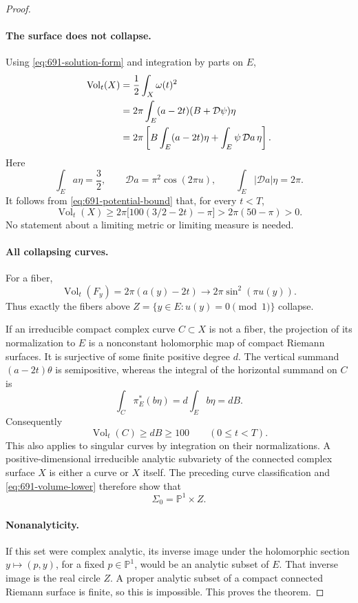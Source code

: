 \documentclass[11pt,a4paper]{article}
\theoremstyle{remark}
\begin{document}
\begin{proof}
\paragraph{The surface does not collapse.}
Using \eqref{eq:691-solution-form} and integration by parts on $E$,
\begin{align}
 \operatorname{Vol}_t(X)
 &=\frac12\int_X\omega(t)^2\notag\\
 &=2\pi\int_E(a-2t)(B+\mathcal D\psi)\eta\notag\\
 &=2\pi\left[B\int_E(a-2t)\eta
                 +\int_E\psi\,\mathcal D a\,\eta\right].
 \label{eq:691-volume}
\end{align}
Here
\[
 \int_E a\eta=\frac32,\qquad
 \mathcal D a=\pi^2\cos(2\pi u),\qquad
 \int_E|\mathcal D a|\eta=2\pi.
\]
It follows from \eqref{eq:691-potential-bound} that, for every $t<T$,
\begin{equation}
 \operatorname{Vol}_t(X)
 \ge2\pi\bigl[100(3/2-2t)-\pi\bigr]
 >2\pi(50-\pi)>0.
 \label{eq:691-volume-lower}
\end{equation}
No statement about a limiting metric or limiting measure is needed.

\paragraph{All collapsing curves.}
For a fiber,
\[
 \operatorname{Vol}_t(F_y)=2\pi(a(y)-2t)
 \longrightarrow2\pi\sin^2(\pi u(y)).
\]
Thus exactly the fibers above $Z=\{y\in E:u(y)=0\pmod1\}$ collapse.

If an irreducible compact complex curve $C\subset X$ is not a fiber, the projection of its normalization to $E$ is a nonconstant holomorphic map of compact Riemann surfaces. It is surjective of some finite positive degree $d$. The vertical summand $(a-2t)\theta$ is semipositive, whereas the integral of the horizontal summand on $C$ is
\[
 \int_C\pi_E^*(b\eta)=d\int_E b\eta=dB.
\]
Consequently
\[
 \operatorname{Vol}_t(C)\ge dB\ge100
 \qquad(0\le t<T).
\]
This also applies to singular curves by integration on their normalizations. A positive-dimensional irreducible analytic subvariety of the connected complex surface $X$ is either a curve or $X$ itself. The preceding curve classification and \eqref{eq:691-volume-lower} therefore show that
\[
 \Sigma_0=\mathbb P^1\times Z.
\]

\paragraph{Nonanalyticity.}
If this set were complex analytic, its inverse image under the holomorphic section $y\mapsto(p,y)$, for a fixed $p\in\mathbb P^1$, would be an analytic subset of $E$. That inverse image is the real circle $Z$. A proper analytic subset of a compact connected Riemann surface is finite, so this is impossible. This proves the theorem.
\end{proof}
\end{document}

